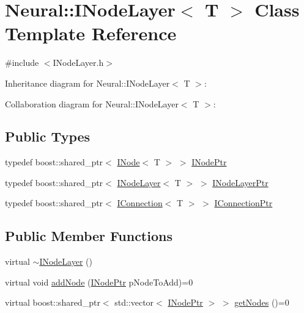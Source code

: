 \hypertarget{class_neural_1_1_i_node_layer}{
\section{Neural::INodeLayer$<$ T $>$ Class Template Reference}
\label{class_neural_1_1_i_node_layer}
}


{\ttfamily \#include $<$INodeLayer.h$>$}



Inheritance diagram for Neural::INodeLayer$<$ T $>$:


Collaboration diagram for Neural::INodeLayer$<$ T $>$:
\subsection*{Public Types}
\begin{DoxyCompactItemize}
\item 
typedef boost::shared\_\-ptr$<$ \hyperlink{class_neural_1_1_i_node}{INode}$<$ T $>$ $>$ \hyperlink{class_neural_1_1_i_node_layer_a31357b3a61112d5c534c52693ffba054}{INodePtr}
\item 
typedef boost::shared\_\-ptr$<$ \hyperlink{class_neural_1_1_i_node_layer}{INodeLayer}$<$ T $>$ $>$ \hyperlink{class_neural_1_1_i_node_layer_a63927dd7063f14e4e8df5d9180c85309}{INodeLayerPtr}
\item 
typedef boost::shared\_\-ptr$<$ \hyperlink{class_neural_1_1_i_connection}{IConnection}$<$ T $>$ $>$ \hyperlink{class_neural_1_1_i_node_layer_ab117db196ffa2ff59c58bc3a4fbdfa09}{IConnectionPtr}
\end{DoxyCompactItemize}
\subsection*{Public Member Functions}
\begin{DoxyCompactItemize}
\item 
virtual \hyperlink{class_neural_1_1_i_node_layer_a96144758b7a584594924ab1b5ba19c27}{$\sim$INodeLayer} ()
\item 
virtual void \hyperlink{class_neural_1_1_i_node_layer_a57007b3b42d7e91384c1054896c9d31f}{addNode} (\hyperlink{class_neural_1_1_i_node_layer_a31357b3a61112d5c534c52693ffba054}{INodePtr} pNodeToAdd)=0
\item 
virtual boost::shared\_\-ptr$<$ std::vector$<$ \hyperlink{class_neural_1_1_i_node_layer_a31357b3a61112d5c534c52693ffba054}{INodePtr} $>$ $>$ \hyperlink{class_neural_1_1_i_node_layer_af94f37f24b4ab3d9a39696bbfbe4eaad}{getNodes} ()=0
\end{DoxyCompactItemize}

